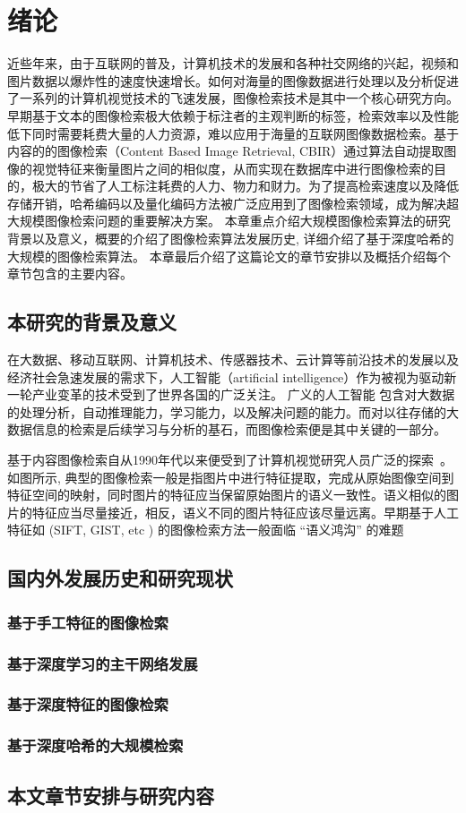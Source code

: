 
\chapter{绪论}
近些年来，由于互联网的普及，计算机技术的发展和各种社交网络的兴起，视频和图片数据以爆炸性的速度快速增长。如何对海量的图像数据进行处理以及分析促进了一系列的计算机视觉技术的飞速发展，图像检索技术是其中一个核心研究方向。早期基于文本的图像检索极大依赖于标注者的主观判断的标签，检索效率以及性能低下同时需要耗费大量的人力资源，难以应用于海量的互联网图像数据检索。基于内容的的图像检索（Content Based Image Retrieval, CBIR）通过算法自动提取图像的视觉特征来衡量图片之间的相似度，从而实现在数据库中进行图像检索的目的，极大的节省了人工标注耗费的人力、物力和财力。为了提高检索速度以及降低存储开销，哈希编码以及量化编码方法被广泛应用到了图像检索领域，成为解决超大规模图像检索问题的重要解决方案。 本章重点介绍大规模图像检索算法的研究背景以及意义，概要的介绍了图像检索算法发展历史, 详细介绍了基于深度哈希的大规模的图像检索算法。 本章最后介绍了这篇论文的章节安排以及概括介绍每个章节包含的主要内容。
\section{本研究的背景及意义}
在大数据、移动互联网、计算机技术、传感器技术、云计算等前沿技术的发展以及经济社会急速发展的需求下，人工智能（artificial intelligence）作为被视为驱动新一轮产业变革的技术受到了世界各国的广泛关注。 广义的人工智能\cite*{russell2010artificial} 包含对大数据的处理分析，自动推理能力，学习能力，以及解决问题的能力。而对以往存储的大数据信息的检索是后续学习与分析的基石，而图像检索便是其中关键的一部分。 \par
基于内容图像检索自从1990年代以来便受到了计算机视觉研究人员广泛的探索~\cite{}。如图所示, 典型的图像检索一般是指图片中进行特征提取，完成从原始图像空间到特征空间的映射，同时图片的特征应当保留原始图片的语义一致性。语义相似的图片的特征应当尽量接近，相反，语义不同的图片特征应该尽量远离。早期基于人工特征如 (SIFT, GIST, etc ) 的图像检索方法一般面临 ``语义鸿沟'' \cite*{bibid}的难题
\section{国内外发展历史和研究现状}
\subsection{基于手工特征的图像检索}
\subsection{基于深度学习的主干网络发展}
\subsection{基于深度特征的图像检索}
\subsection{基于深度哈希的大规模检索}

\section{本文章节安排与研究内容}